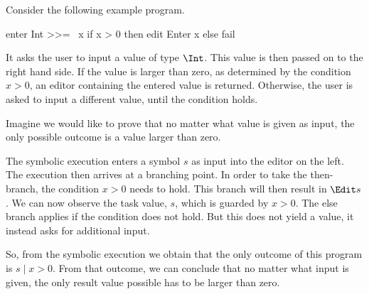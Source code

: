 \begin{example}
Consider the following example program.

\begin{TASK}
  enter Int >>= \ x if x > 0 then edit Enter x else fail
\end{TASK}

It asks the user to input a value of type $\Int$.
This value is then passed on to the right hand side.
If the value is larger than zero, as determined by the condition $x>0$,
an editor containing the entered value is returned.
Otherwise, the user is asked to input a different value, until the condition holds.

Imagine we would like to prove that no matter what value is given as input,
the only possible outcome is a value larger than zero.

The symbolic execution enters a symbol $s$ as input into the editor on the left.
The execution then arrives at a branching point.
In order to take the then-branch, the condition $x>0$ needs to hold.
This branch will then result in $\Edit s$.
We can now observe the task value, $s$, which is guarded by $x>0$.
The else branch applies if the condition does not hold.
But this does not yield a value, it instead asks for additional input.

So, from the symbolic execution we obtain that the only outcome of this program is $s \mid x>0$.
From that outcome, we can conclude that no matter what input is given, the only result value possible has to be larger than zero.
\label{example:abs}
\end{example}
